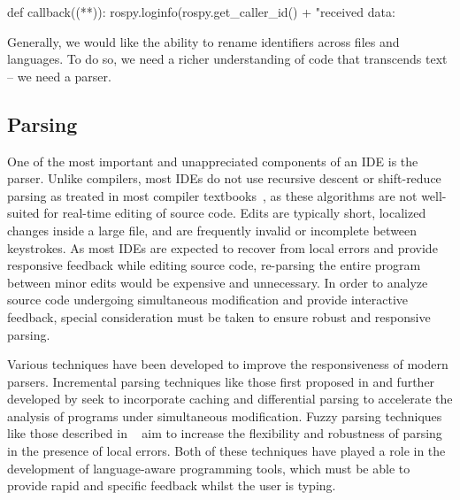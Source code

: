 \begin{pythonlisting}
def callback((**)):
    rospy.loginfo(rospy.get_caller_id() + "received data: %
\end{pythonlisting}
%
Generally, we would like the ability to rename identifiers across files and languages. To do so, we need a richer understanding of code that transcends text -- we need a parser.

\subsection{Parsing}\label{subsec:the-parser}

One of the most important and unappreciated components of an IDE is the parser. Unlike compilers, most IDEs do not use recursive descent or shift-reduce parsing as treated in most compiler textbooks~\citep{appel2003modern}, as these algorithms are not well-suited for real-time editing of source code. Edits are typically short, localized changes inside a large file, and are frequently invalid or incomplete between keystrokes. As most IDEs are expected to recover from local errors and provide responsive feedback while editing source code, re-parsing the entire program between minor edits would be expensive and unnecessary. In order to analyze source code undergoing simultaneous modification and provide interactive feedback, special consideration must be taken to ensure robust and responsive parsing.

Various techniques have been developed to improve the responsiveness of modern parsers. Incremental parsing techniques like those first proposed in \citet{ghezzi1979incremental} and further developed by \citet{wagner1997practical,wagner1997incremental} seek to incorporate caching and differential parsing to accelerate the analysis of programs under simultaneous modification. Fuzzy parsing techniques like those described in ~\citet{koppler1997systematic} aim to increase the flexibility and robustness of parsing in the presence of local errors. Both of these techniques have played a role in the development of language-aware programming tools, which must be able to provide rapid and specific feedback whilst the user is typing.

